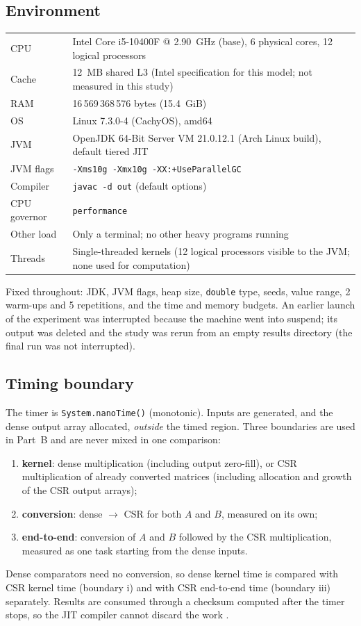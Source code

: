 \documentclass[11pt,a4paper]{article}
\begin{document}
\subsection{Environment}
\begin{center}\small
\begin{tabular}{@{}ll@{}}\toprule
CPU & Intel Core i5-10400F @ 2.90~GHz (base), 6 physical cores, 12 logical processors\\
Cache & 12~MB shared L3 (Intel specification for this model; not measured in this study)\\
RAM & 16\,569\,368\,576 bytes (15.4~GiB)\\
OS & Linux 7.3.0-4 (CachyOS), amd64\\
JVM & OpenJDK 64-Bit Server VM 21.0.12.1 (Arch Linux build), default tiered JIT\\
JVM flags & \texttt{-Xms10g -Xmx10g -XX:+UseParallelGC}\\
Compiler & \texttt{javac -d out} (default options)\\
CPU governor & \texttt{performance}\\
Other load & Only a terminal; no other heavy programs running\\
Threads & Single-threaded kernels (12 logical processors visible to the JVM; none used for computation)\\\bottomrule
\end{tabular}
\end{center}
Fixed throughout: JDK, JVM flags, heap size, \texttt{double} type, seeds, value range, 2 warm-ups and 5 repetitions, and the time and memory budgets. An earlier launch of the experiment was interrupted because the machine went into suspend; its output was deleted and the study was rerun from an empty results directory (the final run was not interrupted).

\subsection{Timing boundary}
The timer is \texttt{System.nanoTime()} (monotonic). Inputs are generated, and the dense output array allocated, \emph{outside} the timed region. Three boundaries are used in Part~B and are never mixed in one comparison:
\begin{enumerate}[label=(\roman*)]
\item \textbf{kernel}: dense multiplication (including output zero-fill), or CSR multiplication of already converted matrices (including allocation and growth of the CSR output arrays);
\item \textbf{conversion}: dense $\to$ CSR for both $A$ and $B$, measured on its own;
\item \textbf{end-to-end}: conversion of $A$ and $B$ followed by the CSR multiplication, measured as one task starting from the dense inputs.
\end{enumerate}
Dense comparators need no conversion, so dense kernel time is compared with CSR kernel time (boundary i) and with CSR end-to-end time (boundary iii) separately. Results are consumed through a checksum computed after the timer stops, so the JIT compiler cannot discard the work \cite{georges2007}.
\end{document}
